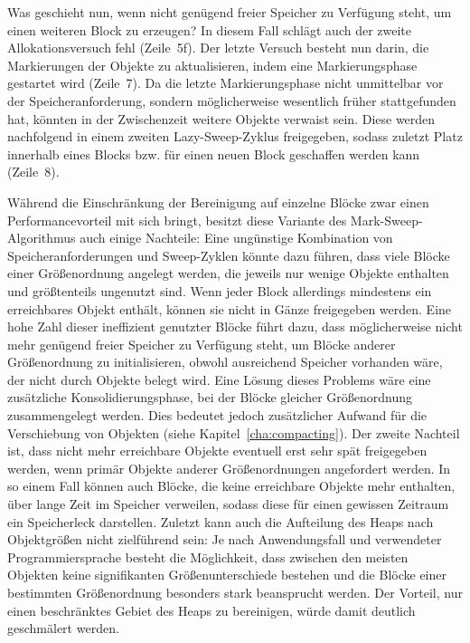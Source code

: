 Was geschieht nun, wenn nicht genügend freier Speicher zu Verfügung steht, um einen weiteren Block zu erzeugen?
In diesem Fall schlägt auch der zweite Allokationsversuch fehl (Zeile~5f).
Der letzte Versuch besteht nun darin, die Markierungen der Objekte zu aktualisieren, indem eine Markierungsphase gestartet wird (Zeile~7).
Da die letzte Markierungsphase nicht unmittelbar vor der Speicheranforderung, sondern möglicherweise wesentlich früher stattgefunden hat, könnten in der Zwischenzeit weitere Objekte verwaist sein.
Diese werden nachfolgend in einem zweiten Lazy-Sweep-Zyklus freigegeben, sodass zuletzt Platz innerhalb eines Blocks bzw. für einen neuen Block geschaffen werden kann (Zeile~8).

Während die Einschränkung der Bereinigung auf einzelne Blöcke zwar einen Performancevorteil mit sich bringt, besitzt diese Variante des Mark-Sweep-Algorithmus auch einige Nachteile:
Eine ungünstige Kombination von Speicheranforderungen und Sweep-Zyklen könnte dazu führen, dass viele Blöcke einer Größenordnung angelegt werden, die jeweils nur wenige Objekte enthalten und größtenteils ungenutzt sind.
Wenn jeder Block allerdings mindestens ein erreichbares Objekt enthält, können sie nicht in Gänze freigegeben werden.
Eine hohe Zahl dieser ineffizient genutzter Blöcke führt dazu, dass möglicherweise nicht mehr genügend freier Speicher zu Verfügung steht, um Blöcke anderer Größenordnung zu initialisieren, obwohl ausreichend Speicher vorhanden wäre, der nicht durch Objekte belegt wird.
Eine Lösung dieses Problems wäre eine zusätzliche Konsolidierungsphase, bei der Blöcke gleicher Größenordnung zusammengelegt werden.
Dies bedeutet jedoch zusätzlicher Aufwand für die Verschiebung von Objekten (siehe Kapitel~\ref{cha:compacting}).
Der zweite Nachteil ist, dass nicht mehr erreichbare Objekte eventuell erst sehr spät freigegeben werden, wenn primär Objekte anderer Größenordnungen angefordert werden.
In so einem Fall können auch Blöcke, die keine erreichbare Objekte mehr enthalten, über lange Zeit im Speicher verweilen, sodass diese für einen gewissen Zeitraum ein Speicherleck darstellen.
Zuletzt kann auch die Aufteilung des Heaps nach Objektgrößen nicht zielführend sein:
Je nach Anwendungsfall und verwendeter Programmiersprache besteht die Möglichkeit, dass zwischen den meisten Objekten keine signifikanten Größenunterschiede bestehen und die Blöcke einer bestimmten Größenordnung besonders stark beansprucht werden.
Der Vorteil, nur einen beschränktes Gebiet des Heaps zu bereinigen, würde damit deutlich geschmälert werden.


